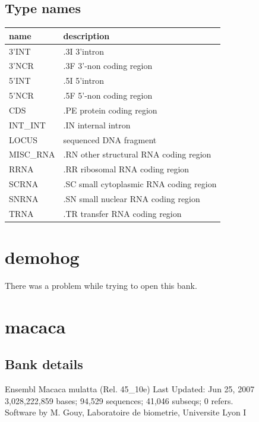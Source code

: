 \documentclass{article}
\begin{document}
\begin{Schunk}
\subsection{Type names}
\noindent\begin{tabular}{ll}
\hline \hline
name & description\\
\hline
3'INT & .3I 3'intron \\
3'NCR & .3F  3'-non coding region \\
5'INT & .5I 5'intron \\
5'NCR & .5F  5'-non coding region \\
CDS & .PE protein coding region \\
INT\_INT & .IN  internal intron \\
LOCUS & sequenced DNA fragment \\
MISC\_RNA & .RN other structural RNA coding region \\
RRNA & .RR ribosomal RNA coding region \\
SCRNA & .SC small cytoplasmic RNA coding region \\
SNRNA & .SN small nuclear RNA coding region \\
TRNA & .TR transfer RNA coding region \\
\hline \hline
\end{tabular}

\section{ demohog }
There was a problem while trying to open this bank.
\section{ macaca }
\subsection{Bank details}
Ensembl Macaca mulatta (Rel. 45\_10e) Last Updated: Jun 25, 2007\\
3,028,222,859 bases; 94,529 sequences; 41,046 subseqs; 0 refers.\\
Software by M. Gouy, Laboratoire de biometrie, Universite Lyon I


\end{Schunk}
\end{document}
